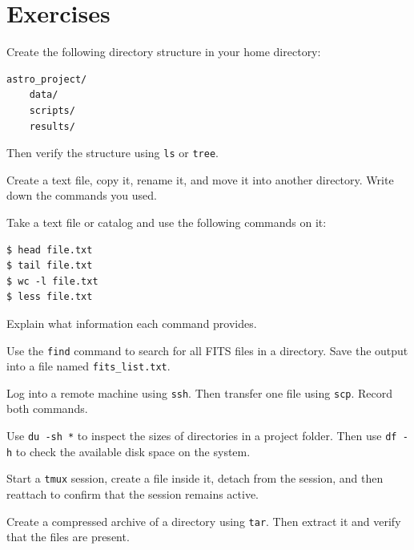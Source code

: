 \section{Exercises}

\begin{exercisebox}
Create the following directory structure in your home directory:

\begin{lstlisting}
astro_project/
    data/
    scripts/
    results/
\end{lstlisting}

Then verify the structure using \texttt{ls} or \texttt{tree}.
\end{exercisebox}

\begin{exercisebox}
Create a text file, copy it, rename it, and move it into another directory.
Write down the commands you used.
\end{exercisebox}

\begin{exercisebox}
Take a text file or catalog and use the following commands on it:

\begin{lstlisting}
$ head file.txt
$ tail file.txt
$ wc -l file.txt
$ less file.txt
\end{lstlisting}

Explain what information each command provides.
\end{exercisebox}

\begin{exercisebox}
Use the \texttt{find} command to search for all FITS files in a directory.
Save the output into a file named \texttt{fits\_list.txt}.
\end{exercisebox}

\begin{exercisebox}
Log into a remote machine using \texttt{ssh}. Then transfer one file using
\texttt{scp}. Record both commands.
\end{exercisebox}

\begin{exercisebox}
Use \texttt{du -sh *} to inspect the sizes of directories in a project folder.
Then use \texttt{df -h} to check the available disk space on the system.
\end{exercisebox}

\begin{exercisebox}
Start a \texttt{tmux} session, create a file inside it, detach from the
session, and then reattach to confirm that the session remains active.
\end{exercisebox}

\begin{exercisebox}
Create a compressed archive of a directory using \texttt{tar}. Then extract
it and verify that the files are present.
\end{exercisebox}